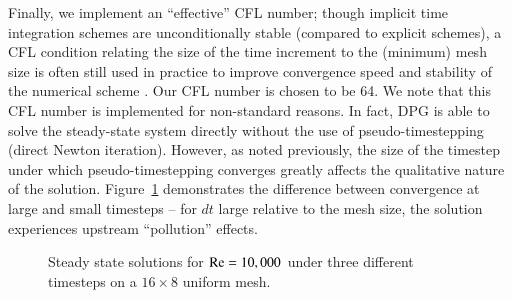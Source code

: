 Finally, we implement an ``effective'' CFL number; though implicit time integration schemes are unconditionally stable (compared to explicit schemes), a CFL condition relating the size of the time increment to the (minimum) mesh size is often still used in practice to improve convergence speed and stability of the numerical scheme \cite{Shakib1991141}.   Our CFL number is chosen to be 64.  We note that this CFL number is implemented for non-standard reasons.  In fact, DPG is able to solve the steady-state system directly without the use of pseudo-timestepping (direct Newton iteration).  However, as noted previously, the size of the timestep under which pseudo-timestepping converges greatly affects the qualitative nature of the solution.  Figure~\ref{fig:dtCompare} demonstrates the difference between convergence at large and small timesteps -- for $dt$ large relative to the mesh size, the solution experiences upstream ``pollution'' effects.  
\begin{figure}
\centering
{}
\caption{Steady state solutions for ${\rm Re} = 10,000$ under three different timesteps on a $16\times 8$ uniform mesh.}
\label{fig:dtCompare}
\end{figure}
